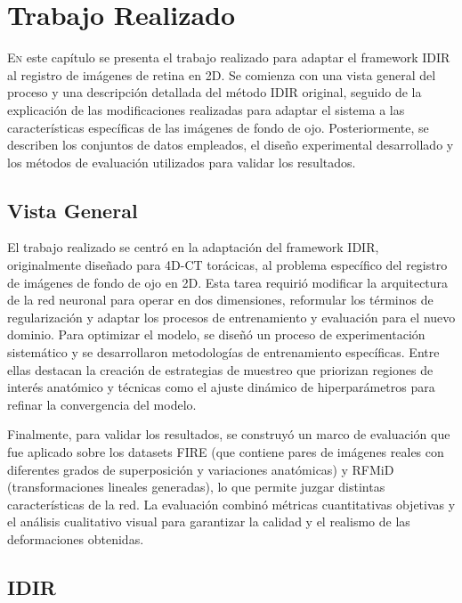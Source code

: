 \chapter{Trabajo Realizado}
\label{chap:Traballo Realizado}

\lettrine{E}{n} este capítulo se presenta el trabajo realizado para adaptar el framework IDIR al registro de imágenes de retina en 2D. Se comienza con una vista general del proceso y una descripción detallada del método IDIR original, seguido de la explicación de las modificaciones realizadas para adaptar el sistema a las características específicas de las imágenes de fondo de ojo. Posteriormente, se describen los conjuntos de datos empleados, el diseño experimental desarrollado y los métodos de evaluación utilizados para validar los resultados.

\section{Vista General}
\label{sec:VistaXeral}

El trabajo realizado se centró en la adaptación del framework IDIR, originalmente diseñado para 4D-CT torácicas, al problema específico del registro de imágenes de fondo de ojo en 2D. Esta tarea requirió modificar la arquitectura de la red neuronal para operar en dos dimensiones, reformular los términos de regularización y adaptar los procesos de entrenamiento y evaluación para el nuevo dominio.
Para optimizar el modelo, se diseñó un proceso de experimentación sistemático y se desarrollaron metodologías de entrenamiento específicas. Entre ellas destacan la creación de estrategias de muestreo que priorizan regiones de interés anatómico y técnicas como el ajuste dinámico de hiperparámetros para refinar la convergencia del modelo.

Finalmente, para validar los resultados, se construyó un marco de evaluación que fue aplicado sobre los datasets FIRE (que contiene pares de imágenes reales con diferentes grados de superposición y variaciones anatómicas) y RFMiD (transformaciones lineales generadas), lo que permite juzgar distintas características de la red. La evaluación combinó métricas cuantitativas objetivas y el análisis cualitativo visual para garantizar la calidad y el realismo de las deformaciones obtenidas.

\section{IDIR}
\label{sec:IDIR}

